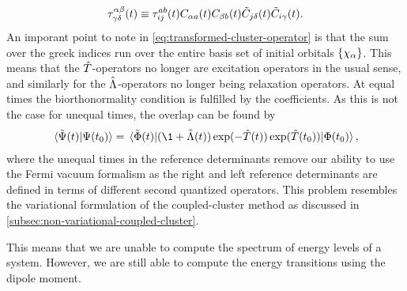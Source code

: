             \begin{align}
                \tau^{\alpha \beta}_{\gamma \delta}(t)
                \equiv
                \tau^{ab}_{ij}(t)
                C_{\alpha a}(t)
                C_{\beta b}(t)
                \tilde{C}_{j\delta}(t)
                \tilde{C}_{i\gamma}(t).
            \end{align}
            An imporant point to note in
            \autoref{eq:transformed-cluster-operator}
            is that the sum over the greek indices run over the entire basis set
            of initial orbitals $\left\{ \chi_{\alpha} \right\}$.
            This means that the $\hat{T}$-operators no longer are excitation
            operators in the usual sense, and similarly for the
            $\hat{\Lambda}$-operators no longer being relaxation operators.
            At equal times the biorthonormality condition is fulfilled by the
            coefficients.
            As this is not the case for unequal times, the overlap can be found
            by
            \begin{align}
                \braket*{\tilde{\Psi}(t)}{\Psi(t_0)}
                =
                \mel*{\tilde{\slat}(t)}{
                    (
                        \1 + \clustl(t)
                    )
                    \exponential(-\clust(t))
                    \exponential(\clust(t_0))
                }{\slat(t_0)},
            \end{align}
            where the unequal times in the reference determinants remove our
            ability to use the Fermi vacuum formalism as the right and left
            reference determinants are defined in terms of different second
            quantized operators.
            This problem resembles the variational formulation of the
            coupled-cluster method as discussed in
            \autoref{subsec:non-variational-coupled-cluster}.

            This means that we are unable to compute the spectrum of energy
            levels of a system.
            However, we are still able to compute the energy transitions using
            the dipole moment.
